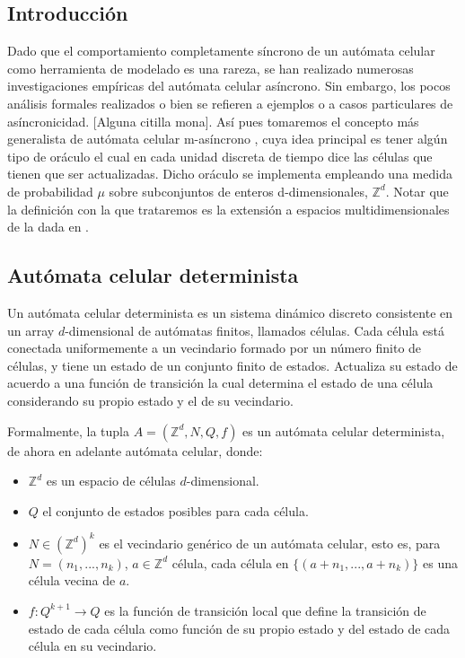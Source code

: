 \documentclass[../proyecto.tex]{memoir}
\begin{document}
\subsection{Introducción}
Dado que el comportamiento completamente síncrono de un autómata celular como herramienta de modelado es una rareza, se han realizado numerosas investigaciones empíricas del autómata celular asíncrono. Sin embargo, los pocos análisis formales realizados o bien se refieren a ejemplos o a casos particulares de asíncronicidad. [Alguna citilla mona]. Así pues tomaremos el concepto más generalista de autómata celular m-asíncrono \cite{oraculo}, cuya idea principal es tener algún tipo de oráculo el cual en cada unidad discreta de tiempo dice las células que tienen que ser actualizadas. Dicho oráculo se implementa empleando una medida de probabilidad $\mu$ sobre subconjuntos de enteros d-dimensionales, $\mathds{Z}^{d}$. Notar que la definición con la que trataremos es la extensión a espacios multidimensionales de la dada en \cite{oraculo}.

\subsection{Autómata celular determinista}
Un autómata celular determinista es un sistema dinámico discreto consistente en un array $d$-dimensional de autómatas finitos, llamados células. Cada célula está conectada uniformemente a un vecindario formado por un número finito de células, y tiene un estado de un conjunto finito de estados. Actualiza su estado de acuerdo a una función de transición la cual determina el estado de una célula considerando su propio estado y el de su vecindario. 

\begin{defi}
Formalmente, la tupla $A=(\mathds{Z}^{d}, N, Q, f)$ es un autómata celular determinista, de ahora en adelante autómata celular, donde:

\begin{itemize}
\item $\mathds{Z} ^{d}$ es un espacio de células $d$-dimensional.
\item $Q$ el conjunto de estados posibles para cada célula.
\item $N \in (\mathds{Z}^{d})^{k}$ es el vecindario genérico de un autómata celular, esto es, para $N=(n_{1},...,n_{k})$, $a \in \mathds{Z} ^{d}$ célula, cada célula en $\{(a+n_{1},...,a+n_{k})\}$ es una célula vecina de $a$.
\item $f:Q^{k+1} \rightarrow Q$ es la función de transición local que define la transición de estado de cada célula como función de su propio estado y del estado de cada célula en su vecindario. 
\end{itemize}

\end{defi}
\end{document}
